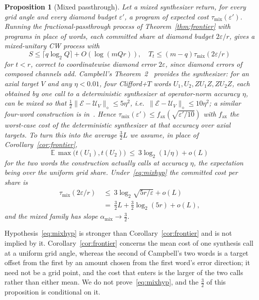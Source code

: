 \documentclass[aps,prx,twocolumn,superscriptaddress,nofootinbib,longbibliography]{revtex4-2}
\theoremstyle{plain}
\newtheorem{proposition}{Proposition}
\theoremstyle{definition}
\theoremstyle{remark}
\newcommand{\E}{\mathbb{E}}
\begin{document}
\begin{proposition}[Mixed passthrough]\label{prop:mixach}
Let a \emph{mixed synthesizer} return, for every grid angle and every diamond budget $\varepsilon'$, a program of expected cost $\tau_{\mathrm{mix}}(\varepsilon')$. Running the fractional-passthrough process of Theorem~\ref{thm:frontier} with programs in place of words, each committed share at diamond budget $2\varepsilon/r$, gives a mixed-unitary CW process with
\[
S\le\lceil q\log_2Q\rceil+O(\log(mQr)),\quad T_t\le(m-q)\tau_{\mathrm{mix}}(2\varepsilon/r)
\]
for $t<r$, correct to coordinatewise diamond error $2\varepsilon$, since diamond errors of composed channels add. Campbell's Theorem~2~\cite{Campbell17} provides the synthesizer: for an axial target $V$ and any $\eta<0.01$, four Clifford+$T$ words $U_1,U_2,ZU_1Z,ZU_2Z$, each obtained by one call to a deterministic synthesizer at operator-norm accuracy $\eta$, can be mixed so that $\tfrac12\|\mathcal E-\mathcal U_V\|_\diamond\le5\eta^2$, i.e.\ $\|\mathcal E-\mathcal U_V\|_\diamond\le10\eta^2$; a similar four-word construction is in~\cite{Hastings17}. Hence $\tau_{\mathrm{mix}}(\varepsilon')\le f_{\mathrm{ax}}(\sqrt{\varepsilon'/10})$ with $f_{\mathrm{ax}}$ the \emph{worst-case} cost of the deterministic synthesizer at that accuracy over axial targets. To turn this into the average $\tfrac32L$ we assume, in place of Corollary~\ref{cor:frontier},
\begin{equation}\label{eq:mixhyp}
\E\,\max\big(t(U_1),t(U_2)\big)\ \le\ 3\log_2(1/\eta)+o(L)
\end{equation}
for the two words the construction actually calls at accuracy $\eta$, the expectation being over the uniform grid share. Under~\eqref{eq:mixhyp} the committed cost per share is
\[
\begin{aligned}
\tau_{\mathrm{mix}}(2\varepsilon/r)\ &\le\ 3\log_2\sqrt{5r/\varepsilon}+o(L)\\
&=\ \tfrac32L+\tfrac32\log_2(5r)+o(L),
\end{aligned}
\]
and the mixed family has slope $\alpha_{\mathrm{mix}}\to\tfrac32$.
\end{proposition}
Hypothesis~\eqref{eq:mixhyp} is stronger than Corollary~\ref{cor:frontier} and is not implied by it. Corollary~\ref{cor:frontier} concerns the mean cost of one synthesis call at a uniform grid angle, whereas the second of Campbell's two words is a target offset from the first by an amount chosen from the first word's error direction; it need not be a grid point, and the cost that enters is the larger of the two calls rather than either mean. We do not prove~\eqref{eq:mixhyp}, and the $\tfrac32$ of this proposition is conditional on it.
\end{document}
